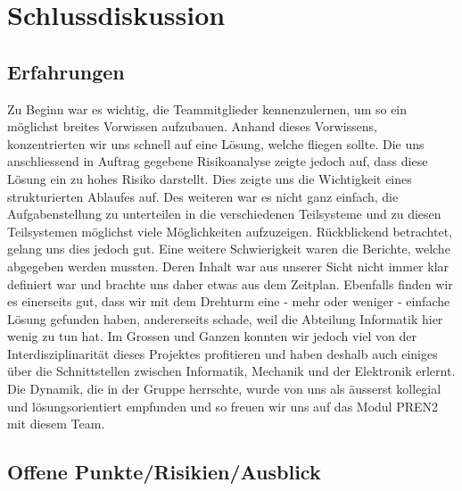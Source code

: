 \section{Schlussdiskussion}

\subsection{Erfahrungen}

Zu Beginn war es wichtig, die Teammitglieder kennenzulernen, um so ein 
möglichst breites Vorwissen aufzubauen. Anhand dieses Vorwissens, 
konzentrierten wir uns schnell auf eine Lösung, welche fliegen sollte. Die uns 
anschliessend in Auftrag gegebene Risikoanalyse zeigte jedoch auf, dass diese 
Lösung ein zu hohes Risiko darstellt. Dies zeigte uns die 
Wichtigkeit eines strukturierten Ablaufes auf. Des weiteren war es nicht ganz 
einfach, die Aufgabenstellung zu unterteilen in die verschiedenen Teilsysteme 
und zu diesen Teilsystemen möglichst viele Möglichkeiten aufzuzeigen. 
Rückblickend betrachtet, gelang uns dies jedoch gut. Eine weitere 
Schwierigkeit waren die Berichte, welche abgegeben werden mussten. 
Deren Inhalt war aus unserer Sicht nicht immer klar definiert war und brachte uns daher 
etwas aus dem Zeitplan.
Ebenfalls finden wir es einerseits gut, dass wir mit dem Drehturm eine - mehr oder weniger - einfache Lösung gefunden haben, andererseits schade, weil die Abteilung Informatik hier wenig zu tun hat. Im Grossen und Ganzen konnten wir jedoch viel 
von der Interdisziplinarität dieses Projektes profitieren und haben deshalb 
auch einiges über die Schnittstellen zwischen Informatik, Mechanik und der Elektronik 
erlernt. Die Dynamik, die in der Gruppe herrschte, wurde von uns als äusserst kollegial und lösungsorientiert empfunden und so freuen wir uns auf das Modul PREN2 mit diesem Team.


\subsection{Offene Punkte/Risikien/Ausblick}
